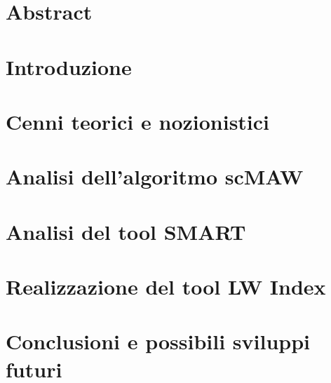 \documentclass[11pt,oneside,a4paper]{book}
\begin{document}
\newpage
\chapter*{}
\thispagestyle{empty}


\newpage
\thispagestyle{empty}
\begin{flushright}
\null{}
{\calligra{}}
\null
\end{flushright}

\newpage
\tableofcontents
\thispagestyle{empty}

\newpage
\fontsize{13.5}{18.5}\selectfont
\setcounter{page}{1}
\chapter*{Abstract}
    
    
\chapter{Introduzione}
    

\chapter{Cenni teorici e nozionistici}
    

\chapter{Analisi dell'algoritmo scMAW}
    

\chapter{Analisi del tool SMART}
    

\chapter{Realizzazione del tool LW Index}
    
    
\chapter{Conclusioni e possibili sviluppi futuri}
    

\printbibliography
\end{document}
